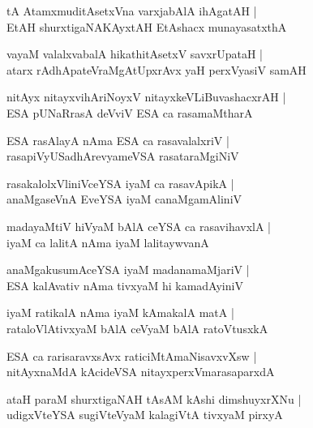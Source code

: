 \documentclass[twoside,12pt,openright]{book}
\newcounter{shloka}[chapter]
\begin{document}
\begin{shloka}%
tA AtamxmuditAsetxVna varxjabAlA ihAgatAH |\\
EtAH shurxtigaNAKAyxtAH EtAshacx munayasatxthA 
\end{shloka}

\begin{shloka}%
vayaM valalxvabalA hikathitAsetxV savxrUpataH |\\
atarx rAdhApateVraMgAtUpxrAvx yaH perxVyasiV samAH 
\end{shloka}

\begin{shloka}%
nitAyx nitayxvihAriNoyxV nitayxkeVLiBuvashacxrAH |\\
ESA pUNaRrasA deVviV ESA ca rasamaMtharA 
\end{shloka}

\begin{shloka}%
ESA rasAlayA nAma ESA ca rasavalalxriV |\\
rasapiVyUSadhArevyameVSA rasataraMgiNiV 
\end{shloka}

\begin{shloka}%
rasakalolxVliniVceYSA iyaM ca rasavApikA |\\
anaMgaseVnA EveYSA iyaM canaMgamAliniV 
\end{shloka}

\begin{shloka}%
madayaMtiV hiVyaM bAlA ceYSA ca rasavihavxlA |\\
iyaM ca lalitA nAma iyaM lalitaywvanA
\end{shloka}

\begin{shloka}%
anaMgakusumAceYSA iyaM madanamaMjariV |\\
ESA kalAvativ nAma tivxyaM hi kamadAyiniV 
\end{shloka}

\begin{shloka}%
iyaM ratikalA nAma iyaM kAmakalA matA |\\
rataloVlAtivxyaM bAlA ceVyaM bAlA ratoVtusxkA 
\end{shloka}

\begin{shloka}%
ESA ca rarisaravxsAvx raticiMtAmaNisavxvXsw |\\
nitAyxnaMdA kAcideVSA nitayxperxVmarasaparxdA 
\end{shloka}

\begin{shloka}%
ataH paraM shurxtigaNAH tAsAM kAshi dimshuyxrXNu |\\
udigxVteYSA sugiVteVyaM kalagiVtA tivxyaM pirxyA 
\end{shloka}
\end{document}
